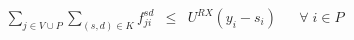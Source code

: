 \begin{figure}
		\begin{equation} \label{eq:capRX}
		\begin{array}{rrclcl}
		&\displaystyle \sum_{j \in V \cup P} \displaystyle \sum_{(s,d) \in K} f^{sd}_{ji} & \leq & U^{RX} ( y_{i} - s_{i} ) && \forall \; i \in P\\
		\end{array}
		\end{equation}
		

\end{figure}
